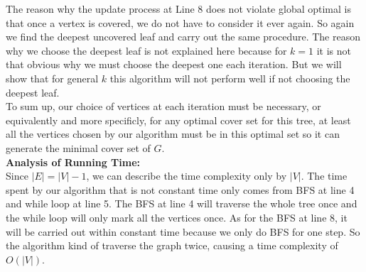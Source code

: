 \documentclass[12pt,letterpaper]{article}
\begin{document}
The reason why the update process at Line 8
does not violate global optimal is that
once a vertex is covered, 
we do not have to consider it ever again.
So again we find the deepest uncovered leaf and carry out the same procedure.
The reason why we choose the deepest leaf is not explained here because
for $k=1$ it is not that obvious why we must choose the deepest one each iteration.
But we will show that for general $k$ this algorithm will not perform well
if not choosing the deepest leaf.\\
To sum up, our choice of vertices at each iteration must be necessary,
or equivalently and more specificly, for any optimal cover set for this tree,
at least all the vertices chosen by our algorithm must be in this optimal set 
so it can generate the minimal cover set of $G$.\\
\textbf{Analysis of Running Time:}\\
Since $|E|=|V|-1$, we can describe the time complexity only by $|V|$.
The time spent by our algorithm that is not constant time only comes from
BFS at line 4 and while loop at line 5.
The BFS at line 4 will traverse the whole tree once
and the while loop will only mark all the vertices once.
As for the BFS at line 8,
it will be carried out within constant time because we only do BFS for one step.
So the algorithm kind of traverse the graph twice,
causing a time complexity of $O(|V|)$.
\end{document}
